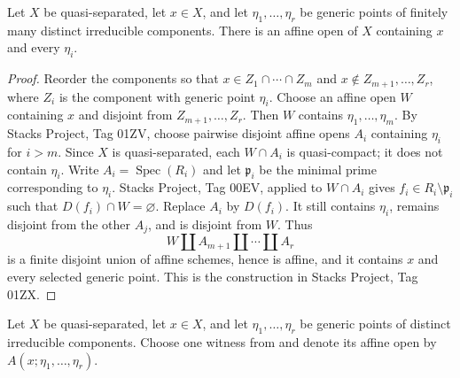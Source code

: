 \begin{lemma}
  \label{lemma:nagata-affine-neighbourhood-generic-points-exists}

  Let $X$ be quasi-separated, let $x\in X$, and let
  $\eta_1,\ldots,\eta_r$ be generic points of finitely many distinct
  irreducible components.  There is an affine open of $X$ containing $x$ and
  every $\eta_i$.
\end{lemma}

\begin{proof}
  Reorder the components so that
  $x\in Z_1\cap\cdots\cap Z_m$ and
  $x\notin Z_{m+1},\ldots,Z_r$, where $Z_i$ is the component with generic
  point $\eta_i$.  Choose an affine open $W$ containing $x$ and disjoint from
  $Z_{m+1},\ldots,Z_r$.  Then $W$ contains
  $\eta_1,\ldots,\eta_m$.  By Stacks Project, Tag 01ZV, choose pairwise
  disjoint affine opens $A_i$ containing $\eta_i$ for $i>m$.  Since $X$ is
  quasi-separated, each $W\cap A_i$ is quasi-compact; it does not contain
  $\eta_i$.  Write $A_i=\operatorname{Spec}(R_i)$ and let
  $\mathfrak p_i$ be the minimal prime corresponding to $\eta_i$.  Stacks
  Project, Tag 00EV, applied to $W\cap A_i$ gives
  $f_i\in R_i\setminus\mathfrak p_i$ such that
  $D(f_i)\cap W=\varnothing$.  Replace $A_i$ by $D(f_i)$.  It still contains
  $\eta_i$, remains disjoint from the other $A_j$, and is disjoint from $W$.
  Thus
  \[
    W\amalg A_{m+1}\amalg\cdots\amalg A_r
  \]
  is a finite disjoint union of affine schemes, hence is affine, and it
  contains $x$ and every selected generic point.  This is the construction in
  Stacks Project, Tag 01ZX.
\end{proof}

\begin{definition}
  \label{def:nagata-affine-neighbourhood-generic-points}

  Let $X$ be quasi-separated, let $x\in X$, and let
  $\eta_1,\ldots,\eta_r$ be generic points of distinct irreducible
  components.  Choose one witness from
   and denote
  its affine open by $A(x;\eta_1,\ldots,\eta_r)$.
\end{definition}

